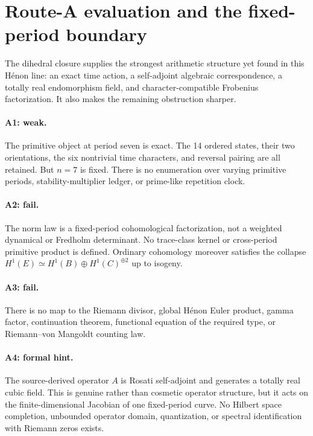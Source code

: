 \section{Route-A evaluation and the fixed-period boundary}\label{sec:route}

The dihedral closure supplies the strongest arithmetic structure yet found in
this H\'enon line: an exact time action, a self-adjoint algebraic
correspondence, a totally real endomorphism field, and character-compatible
Frobenius factorization.  It also makes the remaining obstruction sharper.

\paragraph{A1: weak.}
The primitive object at period seven is exact.  The 14 ordered states, their
two orientations, the six nontrivial time characters, and reversal pairing
are all retained.  But $n=7$ is fixed.  There is no enumeration over varying
primitive periods, stability-multiplier ledger, or prime-like repetition
clock.

\paragraph{A2: fail.}
The norm law is a fixed-period cohomological factorization, not a weighted
dynamical or Fredholm determinant.  No trace-class kernel or cross-period
primitive product is defined.  Ordinary cohomology moreover satisfies the
collapse $H^1(E)\simeq H^1(B)\oplus H^1(C)^{\oplus2}$ up to isogeny.

\paragraph{A3: fail.}
There is no map to the Riemann divisor, global H\'enon Euler product, gamma
factor, continuation theorem, functional equation of the required type, or
Riemann--von Mangoldt counting law.

\paragraph{A4: formal hint.}
The source-derived operator $A$ is Rosati self-adjoint and generates a totally
real cubic field.  This is genuine rather than cosmetic operator structure,
but it acts on the finite-dimensional Jacobian of one fixed-period curve.  No
Hilbert space completion, unbounded operator domain, quantization, or spectral
identification with Riemann zeros exists.


